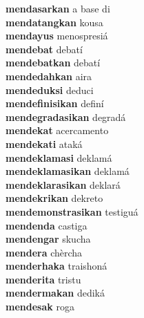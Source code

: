 \textbf{mendasarkan } a base di \\
\textbf{mendatangkan } kousa \\
\textbf{mendayus } menospresiá \\
\textbf{mendebat } debatí \\
\textbf{mendebatkan } debatí \\
\textbf{mendedahkan } aira \\
\textbf{mendeduksi } deduci \\
\textbf{mendefinisikan } definí \\
\textbf{mendegradasikan } degradá \\
\textbf{mendekat } acercamento \\
\textbf{mendekati } ataká \\
\textbf{mendeklamasi } deklamá \\
\textbf{mendeklamasikan } deklamá \\
\textbf{mendeklarasikan } deklará \\
\textbf{mendekrikan } dekreto \\
\textbf{mendemonstrasikan } testiguá \\
\textbf{mendenda } castiga \\
\textbf{mendengar } skucha \\
\textbf{mendera } chèrcha \\
\textbf{menderhaka } traishoná \\
\textbf{menderita } tristu \\
\textbf{mendermakan } dediká \\
\textbf{mendesak } roga \\

